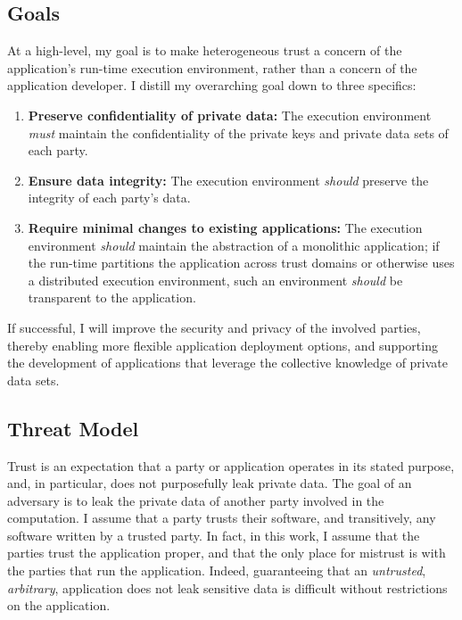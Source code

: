 

\subsection{Goals}
At a high-level, my goal is to make heterogeneous trust a concern
of the application's run-time execution environment, rather than a concern of
the application developer.
%
I distill my overarching goal down to three specifics:

\begin{enumerate}
\item \textbf{Preserve confidentiality of private data:}
    The execution environment \emph{must} maintain the confidentiality of the
    private keys and private data sets of each party.

\item \textbf{Ensure data integrity:} 
    The execution environment \emph{should} preserve the integrity of each
    party's data.

\item \textbf{Require minimal changes to existing applications:}
    The execution environment \emph{should} maintain the abstraction of a
    monolithic application; if the run-time partitions the application
    across trust domains or otherwise uses a distributed execution
    environment, such an environment \emph{should} be transparent to the
    application.
\end{enumerate}

If successful, I will improve the security and privacy of the involved parties,
thereby enabling more flexible application deployment options, and supporting
the development of applications that leverage the collective knowledge of
private data sets.


\subsection{Threat Model}

Trust is an expectation that a party or application operates in its stated
purpose, and, in particular, does not purposefully leak private data.
%
The goal of an adversary is to leak the private data of another party involved
in the computation.
%
I assume that a party trusts their software, and transitively, any software
written by a trusted party.
%
In fact, in this work, I  assume that the parties trust the application proper,
and that the only place for mistrust is with the parties that run the
application.
%
Indeed, guaranteeing that an \emph{untrusted}, \emph{arbitrary}, application
does not leak sensitive data is difficult without restrictions on the
application.


